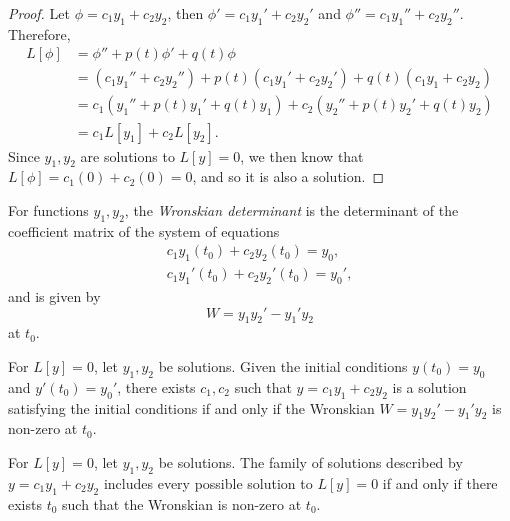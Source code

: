 \begin{proof}
    Let $\phi = c_1y_1 + c_2y_2$, then $\phi' = c_1y_1' + c_2y_2'$ and $\phi'' = c_1y_1'' + c_2y_2''$. Therefore,
    \begin{align*}
        L[\phi] &= \phi'' + p(t)\phi' + q(t)\phi \\
        &= (c_1y_1'' + c_2y_2'') + p(t)(c_1y_1' + c_2y_2') + q(t)(c_1y_1 + c_2y_2) \\
        &= c_1(y_1'' + p(t)y_1' + q(t)y_1) + c_2(y_2'' + p(t)y_2' + q(t)y_2) \\
        &= c_1L[y_1] + c_2L[y_2].
    \end{align*}
    Since $y_1, y_2$ are solutions to $L[y] = 0$, we then know that $L[\phi] = c_1(0) + c_2(0) = 0$, and so it is also a solution.
\end{proof}

\begin{defn}
    For functions $y_1, y_2$, the \emph{Wronskian determinant} is the determinant of the coefficient matrix of the system of equations
    \begin{align*}
        c_1y_1(t_0) + c_2y_2(t_0) = y_0, \\
        c_1y_1'(t_0) + c_2y_2'(t_0) = y_0',
    \end{align*}
    and is given by
    \[W = y_1y_2' - y_1'y_2\] at $t_0$.
\end{defn}

\begin{thm}\label{linear-initial-conditions-existence}
    For $L[y] = 0$, let $y_1, y_2$ be solutions. Given the initial conditions $y(t_0) = y_0$ and $y'(t_0) = y_0'$, there exists $c_1, c_2$ such that $y = c_1y_1 + c_2y_2$ is a solution satisfying the initial conditions if and only if the Wronskian $W = y_1y_2' - y_1'y_2$ is non-zero at $t_0$.
\end{thm}

\begin{thm}\label{linear-second-order-solution-family}
    For $L[y] = 0$, let $y_1, y_2$ be solutions. The family of solutions described by $y = c_1y_1 + c_2y_2$ includes every possible solution to $L[y] = 0$ if and only if there exists $t_0$ such that the Wronskian is non-zero at $t_0$.
\end{thm}

